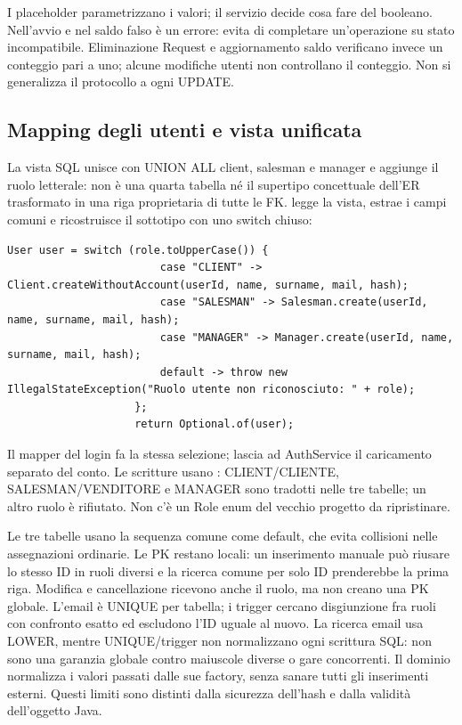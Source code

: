 I placeholder parametrizzano i valori; il servizio decide cosa fare del
booleano. Nell'avvio e nel saldo falso è un errore: evita di completare
un'operazione su stato incompatibile. Eliminazione Request e aggiornamento
saldo verificano invece un conteggio pari a uno; alcune modifiche utenti
non controllano il conteggio. Non si generalizza il protocollo a ogni UPDATE.

\subsection{Mapping degli utenti e vista unificata}\label{sec:impl-utenti-sql}
La vista SQL  unisce con UNION ALL client, salesman e manager
e aggiunge il ruolo letterale: non è una quarta tabella né il supertipo
concettuale dell'ER trasformato in una riga proprietaria di tutte le FK.
 legge la vista, estrae i campi comuni e
ricostruisce il sottotipo con uno switch chiuso:

\noindent\begin{minipage}{\linewidth}
\begin{lstlisting}[firstnumber=69,gobble=20,caption={Ricostruzione del sottotipo dopo la lettura della vista; omesso accesso JDBC.},label=lst:user-mapping]
                    User user = switch (role.toUpperCase()) {
                        case "CLIENT" -> Client.createWithoutAccount(userId, name, surname, mail, hash);
                        case "SALESMAN" -> Salesman.create(userId, name, surname, mail, hash);
                        case "MANAGER" -> Manager.create(userId, name, surname, mail, hash);
                        default -> throw new IllegalStateException("Ruolo utente non riconosciuto: " + role);
                    };
                    return Optional.of(user);
\end{lstlisting}
\end{minipage}

Il mapper del login fa la stessa selezione; 
lascia ad AuthService il caricamento separato del conto. Le scritture
usano : CLIENT/CLIENTE, SALESMAN/VENDITORE e MANAGER
sono tradotti nelle tre tabelle; un altro ruolo è rifiutato. Non c'è un
Role enum del vecchio progetto da ripristinare.

Le tre tabelle usano la sequenza comune  come default,
che evita collisioni nelle assegnazioni ordinarie. Le PK restano locali:
un inserimento manuale può riusare lo stesso ID in ruoli diversi e la
ricerca comune per solo ID prenderebbe la prima riga. Modifica e
cancellazione ricevono anche il ruolo, ma non creano una PK globale.
L'email è UNIQUE per tabella; i trigger cercano disgiunzione fra ruoli
con confronto esatto ed escludono l'ID uguale al nuovo. La ricerca email
usa LOWER, mentre UNIQUE/trigger non normalizzano ogni scrittura SQL:
non sono una garanzia globale contro maiuscole diverse o gare concorrenti.
Il dominio normalizza i valori passati dalle sue factory, senza sanare
tutti gli inserimenti esterni. Questi limiti sono distinti dalla sicurezza
dell'hash e dalla validità dell'oggetto Java.

